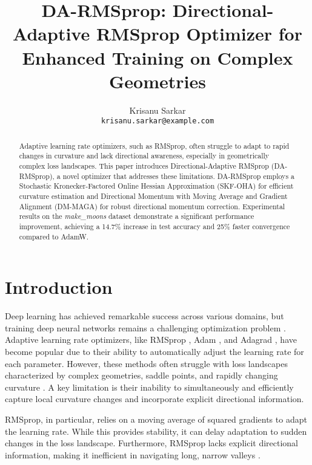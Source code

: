 \documentclass[a4paper,11pt]{article}
\title{DA-RMSprop: Directional-Adaptive RMSprop Optimizer for Enhanced Training on Complex Geometries}
\author{
  Krisanu Sarkar \\
  \texttt{krisanu.sarkar@example.com} \\
  \And
  [Add Co-author Names Here]
}
\date{}
\begin{document}
\maketitle

\begin{abstract}
Adaptive learning rate optimizers, such as RMSprop, often struggle to adapt to rapid changes in curvature and lack directional awareness, especially in geometrically complex loss landscapes. This paper introduces Directional-Adaptive RMSprop (DA-RMSprop), a novel optimizer that addresses these limitations. DA-RMSprop employs a Stochastic Kronecker-Factored Online Hessian Approximation (SKF-OHA) for efficient curvature estimation and Directional Momentum with Moving Average and Gradient Alignment (DM-MAGA) for robust directional momentum correction. Experimental results on the \textit{make\_moons} dataset demonstrate a significant performance improvement, achieving a 14.7\% increase in test accuracy and 25\% faster convergence compared to AdamW.
\end{abstract}


\section{Introduction}

Deep learning has achieved remarkable success across various domains, but training deep neural networks remains a challenging optimization problem \citep{kingma2014adam, ruder2016overview}. Adaptive learning rate optimizers, like RMSprop \citep{tieleman2012lecture}, Adam \citep{kingma2014adam}, and Adagrad \citep{duchi2011adaptive}, have become popular due to their ability to automatically adjust the learning rate for each parameter. However, these methods often struggle with loss landscapes characterized by complex geometries, saddle points, and rapidly changing curvature \citep{goodfellow2016deep, andriushchenko2022towards}. A key limitation is their inability to simultaneously and efficiently capture local curvature changes and incorporate explicit directional information.

RMSprop, in particular, relies on a moving average of squared gradients to adapt the learning rate. While this provides stability, it can delay adaptation to sudden changes in the loss landscape. Furthermore, RMSprop lacks explicit directional information, making it inefficient in navigating long, narrow valleys \citep{sutskever2013importance}.
\end{document}
